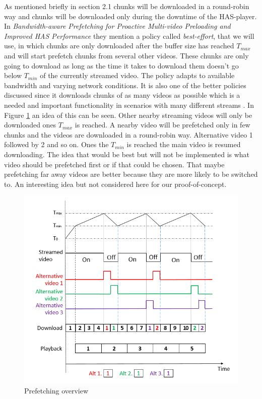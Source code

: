 \documentclass[9pt,a4paper]{acmproc}
\begin{document}
As mentioned briefly in section 2.1 chunks will be downloaded in a round-robin way and chunks will be downloaded only during the downtime of the HAS-player. In \textit{Bandwidth-aware Prefetching for Proactive Multi-video Preloading and Improved HAS Performance} they mention a policy called \textit{best-effort}, that we will use, in which chunks are only downloaded after the buffer size has reached $T_{max}$ and will start prefetch chunks from several other videos. These chunks are only going to download as long as the time it takes to download them doesn't go below $T_{min}$ of the currently streamed video. The policy adapts to available bandwidth and varying network conditions. It is also one of the better policies discussed since it downloads chunks of as many videos as possible which is a needed and important functionality in  scenarios with many different streams \cite{bandawarePrefetch}. In Figure \ref{fig:prefetch} an idea of this can be seen. Other nearby streaming videos will only be downloaded ones $T_{max}$ is reached. A nearby video will be prefetched only in few chunks and the videos are downloaded in a round-robin way. Alternative video 1 followed by 2 and so on. Ones the $T_{min}$ is reached the main video is resumed downloading. The idea that would be best but will not be implemented is what video should be prefetched first or if that could be chosen. That maybe prefetching far away videos are better because they are more likely to be switched to. An interesting idea but not considered here for our proof-of-concept.

\begin{figure}[t!]
\begin{center}
	\includegraphics[scale=0.5]{prefetch.png}
	\caption{Prefetching overview}
	\label{fig:prefetch}
\end{center}
\end{figure}
\end{document}
